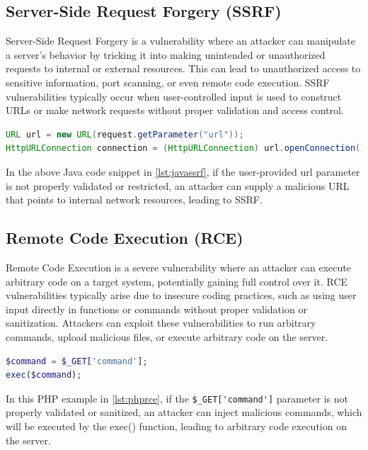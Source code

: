 \documentclass[journal]{IEEEtran}
\begin{document}
\subsection{Server-Side Request Forgery (SSRF)}
Server-Side Request Forgery is a vulnerability where an attacker can manipulate a server's behavior by tricking it into making unintended or unauthorized requests to internal or external resources. This can lead to unauthorized access to sensitive information, port scanning, or even remote code execution. SSRF vulnerabilities typically occur when user-controlled input is used to construct URLs or make network requests without proper validation and access control.

\begin{lstlisting}[caption={Java Server-Side Request Forgery (SSRF)},label={lst:javassrf},language=JAVA,breaklines=true]
URL url = new URL(request.getParameter("url"));
HttpURLConnection connection = (HttpURLConnection) url.openConnection();
\end{lstlisting}

In the above Java code snippet in \ref{lst:javassrf}, if the user-provided url parameter is not properly validated or restricted, an attacker can supply a malicious URL that points to internal network resources, leading to SSRF.

\subsection{Remote Code Execution (RCE)}
Remote Code Execution is a severe vulnerability where an attacker can execute arbitrary code on a target system, potentially gaining full control over it. RCE vulnerabilities typically arise due to insecure coding practices, such as using user input directly in functions or commands without proper validation or sanitization. Attackers can exploit these vulnerabilities to run arbitrary commands, upload malicious files, or execute arbitrary code on the server.

\begin{lstlisting}[caption={PHP Remote Code Execution (RCE)},label={lst:phprce},language=PHP,breaklines=true]
$command = $_GET['command'];
exec($command);
\end{lstlisting}

In this PHP example in \ref{lst:phprce}, if the \verb|$_GET['command']| parameter is not properly validated or sanitized, an attacker can inject malicious commands, which will be executed by the exec() function, leading to arbitrary code execution on the server.
\end{document}
